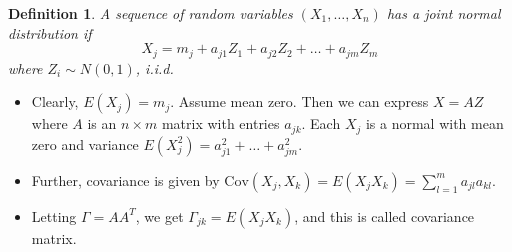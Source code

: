 \documentclass[11pt,reqno]{amsart}
\newtheorem{definition}{Definition}
\theoremstyle{remark}
\begin{document}
\begin{definition}
A sequence of random variables \( (X_1, \ldots, X_n) \) has a joint normal distribution if
\[
X_j = m_j + a_{j1}Z_1 + a_{j2}Z_2 + \ldots + a_{jm}Z_m
\]
where \( Z_i \sim N(0, 1) \), i.i.d.
\end{definition}
\begin{itemize}
\item Clearly, \( E(X_j) = m_j \). Assume mean zero. Then we can express \( X = AZ \) where \( A \) is an \( n \times m \) matrix with entries \( a_{jk} \). Each \( X_j \) is a normal with mean zero and variance \( E(X_j^2) = a_{j1}^2 + \ldots + a_{jm}^2 \).
\item Further, covariance is given by \( \text{Cov}(X_j, X_k) = E(X_jX_k) = \sum_{l=1}^{m} a_{jl}a_{kl} \).
\item Letting \( \Gamma = AA^T \), we get \( \Gamma_{jk} = E(X_jX_k) \), and this is called covariance matrix.
\end{itemize}
\end{document}

